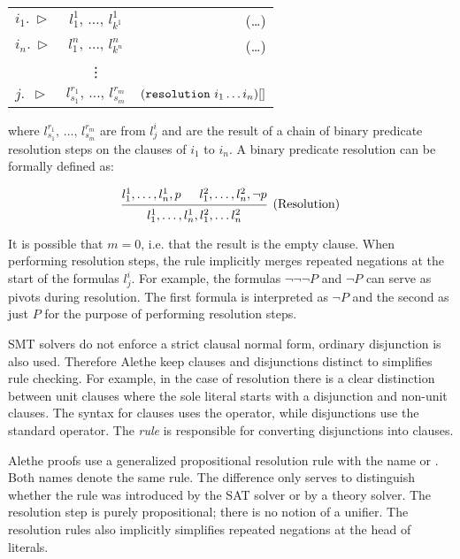 \medskip

\begin{tabular}{l c r}
$i_1.~\triangleright$  & \qquad $l_1^1,\, \dots,\, l_{k^1}^1$ \qquad & (\dots)  \\
$i_n.~\triangleright$  & \qquad $l_1^n,\, \dots,\, l_{k^n}^n$ \qquad & (\dots) \\
  & \vdots  &  \\
$j.~~\triangleright$  & \qquad $l_{s_1}^{r_1},\, \dots,\, l_{s_m}^{r_m}$ \qquad & $(\texttt{\upshape{resolution}}~i_1 \dots i_n)[]$
\end{tabular}

\medskip

where $l_{s_1}^{r_1},\, \dots,\, l_{s_m}^{r_m}$ are from $l^i_j$ and are the result of a chain of binary predicate resolution steps on the clauses of $i_1$ to $i_n$.
A binary predicate resolution can be formally defined as:

\begin{equation*}\label{eq:bin-resolution}
\begin{prooftree}
  \hypo{ l^1_1, \dots, l^1_n, p }
  \hypo{ l^2_1, \dots, l^2_n, \neg p }
  \infer2[(Resolution)]{  l_{1}^{1}, \dots, l^1_n, l^2_1, \dots  l_{n}^2 }
\end{prooftree}
\end{equation*}

It is possible that $m = 0$, i.e. that the result is the empty clause. When performing resolution steps, the rule implicitly merges repeated negations
at the start of the formulas $l^i_j$. For example, the formulas $\neg \neg \neg P$ and $\neg P$ can serve as pivots during resolution.
The first formula is interpreted as $\neg P$ and the second as just $P$ for the purpose of performing resolution steps.

SMT solvers do not enforce a strict clausal normal form, ordinary disjunction is also used.
Therefore Alethe keep clauses and disjunctions distinct to simplifies rule checking.
For example, in the case of resolution there is a clear distinction between unit clauses where the sole literal starts with a disjunction and non-unit clauses.
The syntax for clauses uses the  operator, while disjunctions use the standard  operator.
The  \emph{rule} is responsible for converting disjunctions into clauses.

Alethe proofs use a generalized propositional resolution rule with the name  or .
Both names denote the same rule.
The difference only serves to distinguish whether the rule was introduced by the SAT solver or by a theory solver.
The resolution step is purely propositional; there is no notion of a unifier.
The resolution rules also implicitly simplifies repeated negations at the head of literals.

